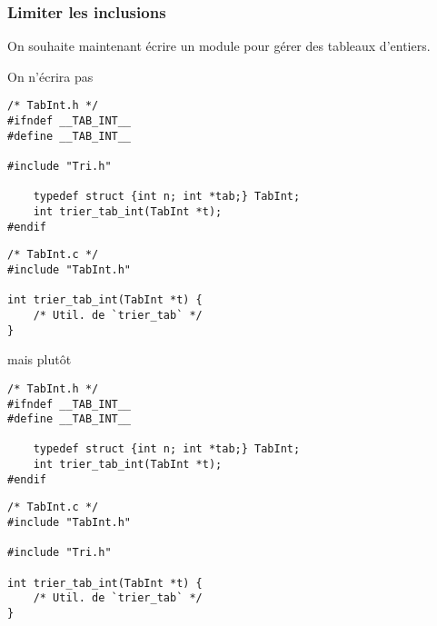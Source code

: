 \begin{frame}[fragile]
\frametitle{Limiter les inclusions}
On souhaite maintenant écrire un module  pour gérer des
tableaux d'entiers.
\medskip

On n'écrira pas

\begin{minipage}[c]{.55\textwidth}
\begin{lstlisting}[frame=single,numbers=none,basicstyle=\ttfamily\scriptsize]
/* TabInt.h */
#ifndef __TAB_INT__
#define __TAB_INT__

#include "Tri.h"

    typedef struct {int n; int *tab;} TabInt;
    int trier_tab_int(TabInt *t);
#endif
\end{lstlisting}
\end{minipage}
\quad
\begin{minipage}[c]{.35\textwidth}
\begin{lstlisting}[frame=single,numbers=none,basicstyle=\ttfamily\scriptsize]
/* TabInt.c */
#include "TabInt.h"

int trier_tab_int(TabInt *t) {
    /* Util. de `trier_tab` */
}
\end{lstlisting}
\end{minipage}

mais plutôt

\begin{minipage}[c]{.55\textwidth}
\begin{lstlisting}[frame=single,numbers=none,basicstyle=\ttfamily\scriptsize]
/* TabInt.h */
#ifndef __TAB_INT__
#define __TAB_INT__

    typedef struct {int n; int *tab;} TabInt;
    int trier_tab_int(TabInt *t);
#endif
\end{lstlisting}
\end{minipage}
\quad
\begin{minipage}[c]{.35\textwidth}
\begin{lstlisting}[frame=single,numbers=none,basicstyle=\ttfamily\scriptsize]
/* TabInt.c */
#include "TabInt.h"

#include "Tri.h"

int trier_tab_int(TabInt *t) {
    /* Util. de `trier_tab` */
}
\end{lstlisting}
\end{minipage}
\end{frame}

